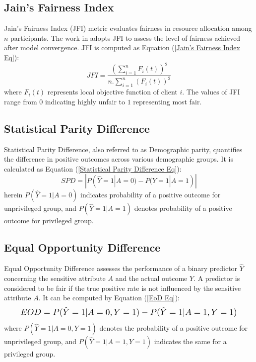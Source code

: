 \documentclass{article}
\begin{document}
\subsection{Jain’s Fairness Index}
\label{SubSec: Jain’s Fairness Index}
Jain’s Fairness Index (JFI) metric evaluates fairness in resource allocation among $n$ participants. The work in \cite{shi2023fairness} adopts JFI to assess the level of fairness achieved after model convergence. JFI is computed as Equation (\ref{Jain’s Fairness Index Eq}):
\begin{equation} \label{Jain’s Fairness Index Eq}
    JFI = \frac{(\sum_{i=1}^n F_i (t))^2}{n.\sum_{i=1}^n (F_i (t))^2} 
\end{equation} 
where $F_i (t)$ represents local objective function of client $i$. The values of JFI  range from $0$ indicating highly unfair to $1$ representing most fair.
    
\subsection{Statistical Parity Difference}
\label{subSec: Statistical Parity Difference}
Statistical Parity Difference, also referred to as Demographic parity, quantifies the difference in positive outcomes across various demographic groups. It is calculated as Equation (\ref{Statistical Parity Difference Eq}):
\begin{equation}  \label{Statistical Parity Difference Eq}
    SPD = |P(\hat{Y} = 1|A = 0) - P(\hat{Y} = 1|A = 1)|
\end{equation}
herein $P(\hat{Y} = 1|A = 0)$ indicates probability of a positive outcome for unprivileged group, and $P(\hat{Y} = 1|A = 1)$ denotes probability of a positive outcome for privileged group. 

\subsection{Equal Opportunity Difference} 
\label{SubSec: Equal Opportunity Difference}
Equal Opportunity Difference assesses the performance of a binary predictor $\hat{Y}$ concerning the sensitive attribute $A$ and the actual outcome $Y$. A predictor is considered to be fair if the true positive rate is not influenced by the sensitive attribute $A$. It can be computed by Equation (\ref{EoD Eq}):
\begin{equation} \label{EoD Eq}
    \resizebox{0.91\linewidth}{!}{$
            \displaystyle
              EOD = P(\hat{Y} = 1|A = 0,Y=1) - P(\hat{Y} = 1|A = 1, Y=1)
             $}
   \end{equation}
where $P(\hat{Y} = 1|A = 0,Y=1)$ denotes the probability of a positive outcome for unprivileged group, and $P(\hat{Y} = 1|A = 1, Y=1)$ indicates the same for a privileged group.  
\end{document}
